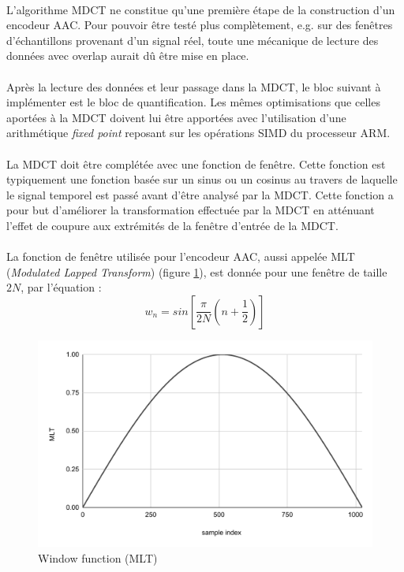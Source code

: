 \documentclass{article}
\begin{document}
    \paragraph{}
    L'algorithme MDCT ne constitue qu'une première étape de la construction d'un encodeur AAC. Pour pouvoir être testé plus complètement, e.g. sur des fenêtres d'échantillons provenant d'un signal réel, toute une mécanique de lecture des données avec overlap aurait dû être mise en place.

    \paragraph{}
    Après la lecture des données et leur passage dans la MDCT, le bloc suivant à implémenter est le bloc de quantification. Les mêmes optimisations que celles aportées à la MDCT doivent lui être apportées avec l'utilisation d'une arithmétique \emph{fixed point} reposant sur les opérations SIMD du processeur ARM.

    \paragraph{}
    La MDCT doit être complétée avec une fonction de fenêtre. Cette fonction est typiquement une fonction basée sur un sinus ou un cosinus au travers de laquelle le signal temporel est passé avant d'être analysé par la MDCT. Cette fonction a pour but d'améliorer la transformation effectuée par la MDCT en atténuant l'effet de coupure aux extrémités de la fenêtre d'entrée de la MDCT.

    \paragraph{}
    La fonction de fenêtre utilisée pour l'encodeur AAC, aussi appelée MLT (\emph{Modulated Lapped Transform}) (figure \ref{fig:mlt}), est donnée pour une fenêtre de taille $2N$, par l'équation :
    $$w_n = sin\left[ \frac{\pi}{2N} \left( n + \frac{1}{2} \right) \right]$$
    \begin{figure}[H]
        \centering
        \includegraphics[width=.8\linewidth]{./images/mlt.pdf}
        \caption{Window function (MLT)}
        \label{fig:mlt}
    \end{figure}
\end{document}
